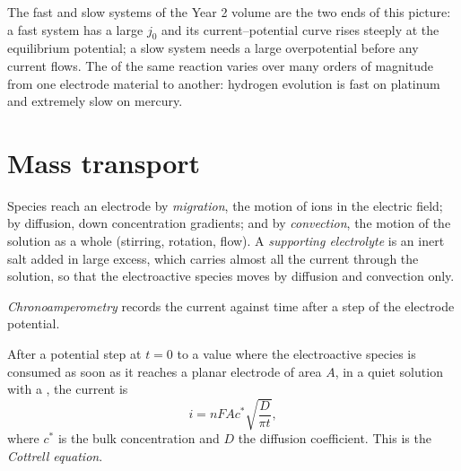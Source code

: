 The fast and slow systems of the Year 2 volume are the two ends of this
picture: a fast system has a large $j_0$ and its current--potential curve rises
steeply at the equilibrium potential; a slow system needs a large overpotential
before any current flows. The  of the same reaction
varies over many orders of magnitude from one electrode material to another:
hydrogen evolution is fast on platinum and extremely slow on mercury.

\section{Mass transport}

\begin{definition}\label{def:b3:electrode-kinetics:transport}
Species reach an electrode by \emph{migration}, the motion of ions
in the electric field; by diffusion, down concentration gradients; and by
\emph{convection}, the motion of the solution as a whole
(stirring, rotation, flow). A \emph{supporting electrolyte} is an inert salt added in large excess, which carries almost all
the current through the solution, so that the electroactive species moves by
diffusion and convection only.
\end{definition}

\begin{definition}[Chronoamperometry]\label{def:b3:electrode-kinetics:chronoamperometry}
\emph{Chronoamperometry} records the current against time
after a step of the electrode potential.
\end{definition}

\begin{theorem}\label{thm:b3:electrode-kinetics:cottrell}
After a potential step at $t = 0$ to a value where the electroactive species is
consumed as soon as it reaches a planar electrode of area $A$, in a quiet
solution with a , the current is
\[
  i = nFAc^*\sqrt{\frac{D}{\pi t}},
\]
where $c^*$ is the bulk concentration and $D$ the diffusion coefficient. This is
the \emph{Cottrell equation}.
\end{theorem}

